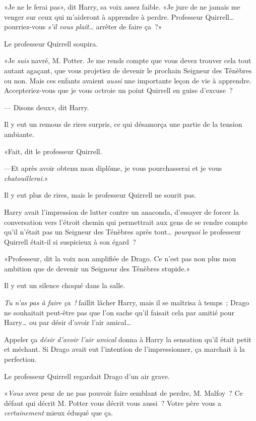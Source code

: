 «Je ne le ferai pas», dit Harry, sa voix assez faible. «Je jure de ne jamais me venger sur ceux qui m'aideront à apprendre à perdre. Professeur Quirrell… pourriez-vous \emph{s'il vous plaît}… arrêter de faire ça~?»

Le professeur Quirrell soupira.

«Je \emph{suis} navré, M. Potter. Je me rends compte que vous devez trouver cela tout autant agaçant, que vous projetiez de devenir le prochain Seigneur des Ténèbres ou non. Mais ces enfants avaient \emph{aussi} une importante leçon de vie à apprendre. Accepteriez-vous que je vous octroie un point Quirrell en guise d'excuse~?

--- Disons deux», dit Harry.

Il y eut un remous de rires surpris, ce qui désamorça une partie de la tension ambiante.

«Fait, dit le professeur Quirrell.

---Et après avoir obtenu mon diplôme, je vous pourchasserai et je vous \emph{chatouillerai}.»

Il y eut plus de rires, mais le professeur Quirrell ne sourit pas.

Harry avait l'impression de lutter contre un anaconda, d'essayer de forcer la conversation vers l'étroit chemin qui permettrait aux gens de se rendre compte qu'il n'était pas un Seigneur des Ténèbres après tout… \emph{pourquoi} le professeur Quirrell était-il si suspicieux à son égard~?

«Professeur, dit la voix non amplifiée de Drago. Ce n'est pas non plus mon ambition que de devenir un Seigneur des Ténèbres stupide.»

Il y eut un silence choqué dans la salle.

\emph{Tu n'as pas à faire ça~!} faillit lâcher Harry, mais il se maîtrisa à temps~; Drago ne souhaitait peut-être pas que l'on sache qu'il faisait cela par amitié pour Harry… ou par désir d'avoir l'air amical…

Appeler ça \emph{désir d'avoir l'air amical} donna à Harry la sensation qu'il était petit et méchant. Si Drago avait eut l'intention de l'impressionner, ça marchait à la perfection.

Le professeur Quirrell regardait Drago d'un air grave.

«\emph{Vous} avez peur de ne pas pouvoir faire semblant de perdre, M. Malfoy~? Ce défaut qui décrit M. Potter vous décrit vous aussi~? Votre père vous a \emph{certainement} mieux éduqué que ça.


